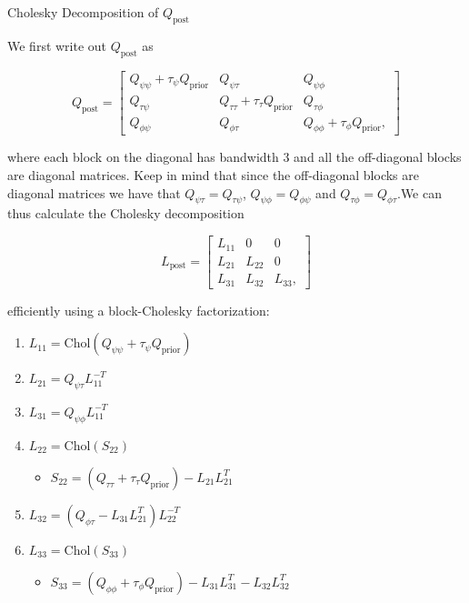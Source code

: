 \documentclass[
  letterpaper,
  DIV=11,
  numbers=noendperiod]{scrartcl}
\makeatletter
\let\oldsubparagraph\subparagraph
\renewcommand{\subparagraph}{
    \@ifstar
      \xxxSubParagraphStar
      \xxxSubParagraphNoStar
  }
\newcommand{\xxxSubParagraphStar}[1]{\oldsubparagraph*{#1}\mbox{}}
\newcommand{\xxxSubParagraphNoStar}[1]{\oldsubparagraph{#1}\mbox{}}
\providecommand{\tightlist}{%
  \setlength{\itemsep}{0pt}\setlength{\parskip}{0pt}}\usepackage{longtable,booktabs,array}
\makeatother
\begin{document}
\subparagraph{\texorpdfstring{Cholesky Decomposition of
\(Q_\text{post}\)}{Cholesky Decomposition of Q\_\textbackslash text\{post\}}}\label{cholesky-decomposition-of-q_textpost}

We first write out \(Q_\text{post}\) as

\[
Q_\text{post} = \begin{bmatrix}
Q_{\psi\psi} + \tau_\psi Q_\text{prior} & Q_{\psi\tau} & Q_{\psi\phi} \\
Q_{\tau\psi} & Q_{\tau\tau} + \tau_\tau Q_\text{prior} & Q_{\tau\phi} \\
Q_{\phi\psi} & Q_{\phi\tau} & Q_{\phi\phi} + \tau_\phi Q_\text{prior},
\end{bmatrix}
\]

where each block on the diagonal has bandwidth 3 and all the
off-diagonal blocks are diagonal matrices. Keep in mind that since the
off-diagonal blocks are diagonal matrices we have that
\(Q_{\psi\tau} = Q_{\tau\psi}\), \(Q_{\psi\phi} = Q_{\phi\psi}\) and
\(Q_{\tau\phi} = Q_{\phi\tau}\).We can thus calculate the Cholesky
decomposition

\[
L_\text{post} = \begin{bmatrix}
L_{11} & 0 & 0 \\
L_{21} & L_{22} & 0 \\
L_{31} & L_{32} & L_{33},
\end{bmatrix}
\]

efficiently using a block-Cholesky factorization:

\begin{enumerate}
\def\labelenumi{\arabic{enumi}.}
\tightlist
\item
  \(L_{11} = \mathrm{Chol}(Q_{\psi\psi} + \tau_\psi Q_\text{prior})\)
\item
  \(L_{21} = Q_{\psi\tau}L_{11}^{-T}\)
\item
  \(L_{31} = Q_{\psi\phi}L_{11}^{-T}\)
\item
  \(L_{22} = \mathrm{Chol}(S_{22})\)

  \begin{itemize}
  \tightlist
  \item
    \(S_{22} = \left(Q_{\tau\tau} + \tau_\tau Q_\text{prior}\right) - L_{21}L_{21}^T\)
  \end{itemize}
\item
  \(L_{32} = \left(Q_{\phi\tau} - L_{31}L_{21}^T\right)L_{22}^{-T}\)
\item
  \(L_{33} = \mathrm{Chol}(S_{33})\)

  \begin{itemize}
  \tightlist
  \item
    \(S_{33} = \left( Q_{\phi\phi} + \tau_\phi Q_\text{prior} \right) - L_{31}L_{31}^T - L_{32}L_{32}^T\)
  \end{itemize}
\end{enumerate}
\end{document}

